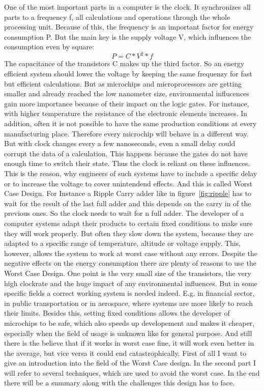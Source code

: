 \documentclass[12pt, a4paper]{article}
\begin{document}
	One of the most important parts in a computer is the clock. It synchronizes all parts to a frequency f, all calculations and operations through the whole processing unit. Because of this, the frequency is an important factor for energy consumption P. But the main key is the supply voltage V, which influences the consumption even by square: 
	\begin{equation}
		P = C * V^2 * f
	\end{equation}
	The capacitance of the transistors C makes up the third factor.\cite{pform} 
	So an energy efficient system should lower the voltage by keeping the same frequenzy for fast but efficient calculations.  
	\newline
	But as microchips and microprocessors are getting smaller and already reached the low nanometer size, environmental influcences gain more importance because of their impact on the logic gates. For instance, with higher temperature the resistance of the electronic elements increases. In addition, often it is not possible to have the same production conditions at every manufacturing place. Therefore every microchip will behave in a different way. But with clock changes every a few nanoseconds, even a small delay could corrupt the data of a calculation. This happens because the gates do not have enough time to switch their state.
	Thus the clock is reliant on these influences.
	This is the reason, why engineers of such systems have to include a specific delay or to increase the voltage to cover unintendend effects. And this is called Worst Case Design.\cite{tea} 
	For Instance a Ripple Carry adder like in figure~\ref{fig:ripple} has to wait for the result of the last full adder and this depends on the carry in of the previous ones. So the clock needs to wait for n full adder. 
	\newline
	The developer of a computer systems adapt their products to certain fixed conditions to make sure they will work properly. But often they slow down the system, because they are adapted to a specific range of temperature, altitude or voltage supply. This, however, allows the system to work at worst case without any errors.
	\newline
	Despite the negative effects on the energy consumption there are plenty of reasons to use the Worst Case Design. One point is the very small size of the transistors, the very high clockrate and the huge impact of any environmental influences. But in some specific fields a correct working system is needed indeed. E.g. in financial sector, in public transportation or in aerospace, where systems are more likely to reach their limits. 
	Besides this, setting fixed conditions allows the developer of microchips to be safe, which also speeds up developement and makes it cheaper, especially when the field of usage is unknown like for general purpose. And still there is the believe that if it works in worst case fine, it will work even better in the average, but vice versa it could end catastrophically.\cite{net}
	\newline
	First of all I want to give an introduction into the field of the Worst Case design. In the second part I will refer to several techniques, which are used to avoid the worst case. In the end there will be a summary along with the challenges this design has to face.
	\newpage
\end{document}
